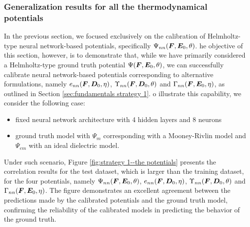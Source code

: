 \subsubsection{Generalization results for all the thermodynamical potentials}

In the previous section, we focused exclusively on the calibration of Helmholtz-type neural network-based potentials, specifically $\Psi_{nn}(\boldsymbol{F},\boldsymbol{E}_0,\theta)$. he objective of this section, however, is to demonstrate that, while we have primarily considered a Helmholtz-type ground truth potential $\Psi(\boldsymbol{F},\boldsymbol{E}_0,\theta)$, we can successfully calibrate neural network-based potentials corresponding to alternative formulations, namely  $e_{nn}(\boldsymbol{F},\boldsymbol{D}_0,\eta)$, $\Upsilon_{nn}(\boldsymbol{F},\boldsymbol{D}_0,\theta)$ and $\Gamma_{nn}(\boldsymbol{F},\boldsymbol{E}_0,\eta)$, as outlined in Section \ref{sec:fundamentals strategy 1}. o illustrate this capability, we consider the following case:

\begin{itemize}
	\item fixed neural network architecture with 4 hidden layers and 8 neurons
	
	\item ground truth model with $\Psi_m$ corresponding with a Mooney-Rivlin model and $\Psi_{em}$ with an ideal dielectric model.
\end{itemize}

Under such scenario, Figure \ref{fig:strategy 1--the potentials} presents the correlation results for the test dataset, which is larger than the training dataset, for the four potentials, namely $\Psi_{nn}(\boldsymbol{F},\boldsymbol{E}_0,\theta)$, $e_{nn}(\boldsymbol{F},\boldsymbol{D}_0,\eta)$, $\Upsilon_{nn}(\boldsymbol{F},\boldsymbol{D}_0,\theta)$ and $\Gamma_{nn}(\boldsymbol{F},\boldsymbol{E}_0,\eta)$. The figure demonstrates an excellent agreement between the predictions made by the calibrated potentials and the ground truth model, confirming the reliability of the calibrated models in predicting the behavior of the ground truth.

